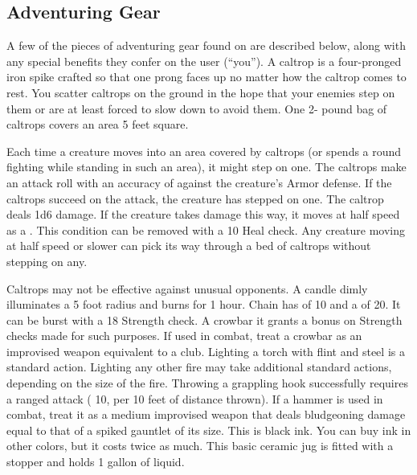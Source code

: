     \subsection{Adventuring Gear}
        A few of the pieces of adventuring gear found on  are described below, along with any special benefits they confer on the user (``you'').
         A caltrop is a four-pronged iron spike crafted so that one prong faces up no matter how the caltrop comes to rest. You scatter caltrops on the ground in the hope that your enemies step on them or are at least forced to slow down to avoid them. One 2- pound bag of caltrops covers an area 5 feet square.
        \par Each time a creature moves into an area covered by caltrops (or spends a round fighting while standing in such an area), it might step on one. The caltrops make an attack roll with an accuracy of  against the creature's Armor defense. If the caltrops succeed on the attack, the creature has stepped on one. The caltrop deals 1d6 damage. If the creature takes damage this way, it moves at half speed as a . This condition can be removed with a  10 Heal check. Any creature moving at half speed or slower can pick its way through a bed of caltrops without stepping on any.
        \par Caltrops may not be effective against unusual opponents.
         A candle dimly illuminates a 5 foot radius and burns for 1 hour.
         Chain has  of 10 and a  of 20. It can be burst with a  18 Strength check.
         A crowbar it grants a  bonus on Strength checks made for such purposes. If used in combat, treat a crowbar as an improvised weapon equivalent to a club.
         Lighting a torch with flint and steel is a standard action.
        Lighting any other fire may take additional standard actions, depending on the size of the fire.
         Throwing a grappling hook successfully requires a ranged attack ( 10,  per 10 feet of distance thrown).
         If a hammer is used in combat, treat it as a medium improvised weapon that deals bludgeoning damage equal to that of a spiked gauntlet of its size.
         This is black ink. You can buy ink in other colors, but it costs twice as much.
         This basic ceramic jug is fitted with a stopper and holds 1 gallon of liquid.

